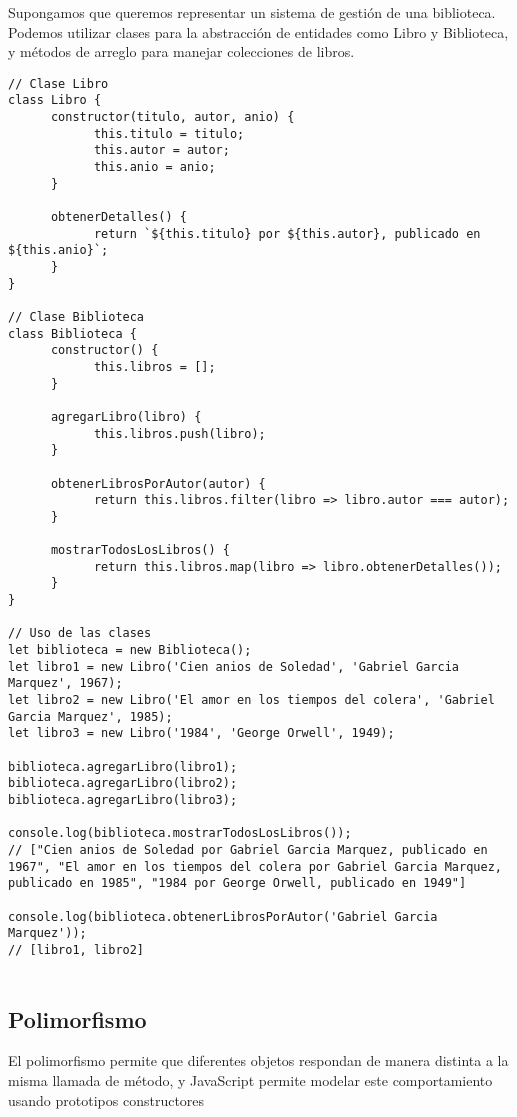 \documentclass{article}
\begin{document}
Supongamos que queremos representar un sistema de gestión de una 
biblioteca. Podemos utilizar clases para la abstracción de entidades como 
Libro y Biblioteca, y métodos de arreglo para manejar colecciones de libros.

\begin{lstlisting}
// Clase Libro
class Libro {
      constructor(titulo, autor, anio) {
            this.titulo = titulo;
            this.autor = autor;
            this.anio = anio;
      }

      obtenerDetalles() {
            return `${this.titulo} por ${this.autor}, publicado en ${this.anio}`;
      }
}

// Clase Biblioteca
class Biblioteca {
      constructor() {
            this.libros = [];
      }

      agregarLibro(libro) {
            this.libros.push(libro);
      }

      obtenerLibrosPorAutor(autor) {
            return this.libros.filter(libro => libro.autor === autor);
      }

      mostrarTodosLosLibros() {
            return this.libros.map(libro => libro.obtenerDetalles());
      }
}

// Uso de las clases
let biblioteca = new Biblioteca();
let libro1 = new Libro('Cien anios de Soledad', 'Gabriel Garcia Marquez', 1967);
let libro2 = new Libro('El amor en los tiempos del colera', 'Gabriel Garcia Marquez', 1985);
let libro3 = new Libro('1984', 'George Orwell', 1949);

biblioteca.agregarLibro(libro1);
biblioteca.agregarLibro(libro2);
biblioteca.agregarLibro(libro3);

console.log(biblioteca.mostrarTodosLosLibros());
// ["Cien anios de Soledad por Gabriel Garcia Marquez, publicado en 1967", "El amor en los tiempos del colera por Gabriel Garcia Marquez, publicado en 1985", "1984 por George Orwell, publicado en 1949"]

console.log(biblioteca.obtenerLibrosPorAutor('Gabriel Garcia Marquez'));
// [libro1, libro2]
      
\end{lstlisting}

\subsection{Polimorfismo}

El polimorfismo permite que diferentes objetos respondan de manera distinta 
a la misma llamada de método, y JavaScript permite modelar este comportamiento
usando prototipos constructores
\end{document}
